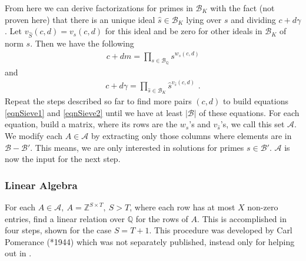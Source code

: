 \documentclass[paper=a4, fontsize=11pt]{scrartcl} %
\numberwithin{equation}{section} %
\numberwithin{figure}{section} %
\numberwithin{table}{section} %
\begin{document}
From here we can derive factorizations for primes in $\mathcal{B}_K$ with the fact (not proven here) that there is an unique ideal $\hat{s}\in\mathcal{B}_K$ lying over $s$ and dividing $c+d\gamma$. Let $v_{\hat{S}}(c,d) = v_s(c,d)$ for this ideal and be zero for other ideals in $\mathcal{B}_K$ of norm $s$. Then we have the following
\begin{eqnarray}
\label{eqnSieve1}
c+dm = \prod_{s\in\mathcal{B}_\mathbb{Q}}s^{w_s(c,d)}
\end{eqnarray}
and
\begin{eqnarray}
\label{eqnSieve2}
c+d\gamma = \prod_{\hat{s}\in\mathcal{B}_K}\hat{s}^{v_{\hat{s}}(c,d)}
\text{ .}
\end{eqnarray}
Repeat the steps described so far to find more pairs $(c,d)$ to build equations \ref{eqnSieve1} and \ref{eqnSieve2} until we have at least $|\mathcal{B}|$ of these equations. For each equation, build a matrix, where its rows are the $w_s$'s and $v_{\hat{s}}$'s, we call this set $\mathcal{A}$. We modify each $A\in\mathcal{A}$ by extracting only those columns where elements are in $\mathcal{B}-\mathcal{B}'$. This means, we are only interested in solutions for primes $s\in\mathcal{B}'$. $\mathcal{A}$ is now the input for the next step.

\subsubsection{Linear Algebra}
For each $A \in \mathcal{A},\ A = \mathbb{Z}^{S\times T},\ S > T$, where each row has at most $X$ non-zero entries, find a linear relation over $\mathbb{Q}$ for the rows of $A$. This is accomplished in four steps, shown for the case $S=T+1$. This procedure was developed by Carl Pomerance (*1944) which was not separately published, instead only for helping out in \citep{gordon1993discrete}.
\end{document}
